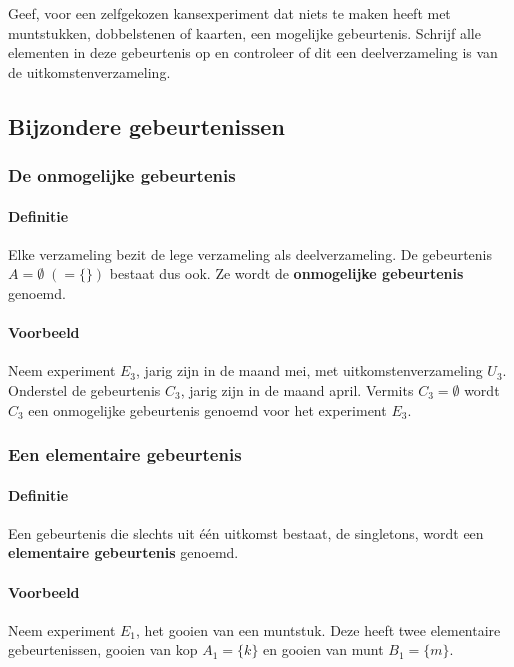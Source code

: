 \documentclass[12pt,twoside]{article}
\begin{document}
\begin{oefening}
Geef, voor een zelfgekozen kansexperiment dat niets te maken heeft met muntstukken, dobbelstenen of kaarten, een mogelijke gebeurtenis. Schrijf alle elementen in deze gebeurtenis op en controleer of dit een deelverzameling is van de uitkomstenverzameling.
\end{oefening}

\subsection{Bijzondere gebeurtenissen}

\subsubsection{De onmogelijke gebeurtenis}

\paragraph*{Definitie} Elke verzameling bezit de lege verzameling als deelverzameling. De gebeurtenis $A = \emptyset \;(=\{\})$ bestaat dus ook. Ze wordt de {\bf onmogelijke gebeurtenis} genoemd.

\paragraph*{Voorbeeld}
Neem experiment $E_3$, jarig zijn in de maand mei, met uitkomstenverzameling $U_3$. Onderstel de gebeurtenis $C_3$, jarig zijn in de maand april. Vermits $C_3=\emptyset$ wordt $C_3$ een onmogelijke gebeurtenis genoemd voor het experiment $E_3$.

\subsubsection{Een elementaire gebeurtenis}

\paragraph*{Definitie} Een gebeurtenis die slechts uit één uitkomst bestaat, de singletons, wordt een {\bf elementaire gebeurtenis} genoemd.

\paragraph*{Voorbeeld}
Neem experiment $E_1$, het gooien van een muntstuk. Deze heeft twee elementaire gebeurtenissen, gooien van kop $A_1=\{k\}$ en gooien van munt $B_1=\{m\}$.
\end{document}

